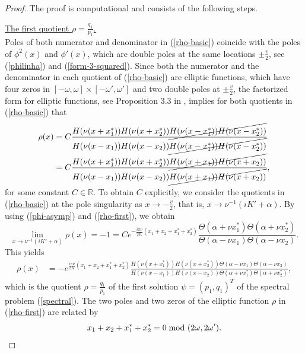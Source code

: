 \documentclass[12pt,reqno]{amsart}
\numberwithin{equation}{section}
\newcommand{\R}{\mathbb{R}}
\begin{document}
\begin{proof}
	The proof is computational and consists of the following steps. 

\underline{The first quotient $\rho = \frac{q_1}{p_1}$.} \\
Poles of both numerator and denominator in (\ref{rho-basic}) coincide with the poles of $\phi^2(x)$ and $\phi'(x)$, which are double poles at the same locations $\pm \frac{v}{2}$, see (\ref{philinha}) and (\ref{form-3-squared}). Since both the numerator and the denominator in each quotient of (\ref{rho-basic}) are elliptic functions, which have four zeros in $[-\omega,\omega] \times [-\omega',\omega']$  and two double poles at $\pm \frac{v}{2}$, the factorized form for elliptic functions, see Proposition 3.3 in \cite{AP25}, implies 
for both quotients in (\ref{rho-basic}) that 
\begin{align}
\rho(x) &= C 
\frac{H(\nu (x + x_1^*)) H(\nu (x + x_2^*)) 
	\cancel{H(\nu (x - x_1^*)) H(\nu (x - x_2^*))}}{H(\nu (x - x_1)) H(\nu (x - x_2)) 
	\cancel{H(\nu (x - x_1^*)) H(\nu (x - x_2^*))}} \notag \\
&= C \frac{H(\nu (x + x_1^*)) H(\nu (x + x_2^*)) 
	\cancel{H(\nu (x + x_1)) H(\nu (x + x_2))}}{H(\nu (x - x_1)) H(\nu (x - x_2)) 
	\cancel{H(\nu (x + x_1)) H(\nu (x + x_2))}}, \label{rho-first}
\end{align} 
for some constant $C \in \R$. To obtain $C$ explicitly, we consider the quotients in (\ref{rho-basic}) at the pole singularity as $x \to -\frac{v}{2}$, that is, 
$x \to \nu^{-1} (iK'+\alpha)$.  By using (\ref{phi-asymp}) and (\ref{rho-first}), we obtain 
\begin{equation}
\label{constant-C-unique}
\lim_{x \to \nu^{-1} (iK'+\alpha)} \rho(x) = -1 = C e^{-\frac{i\pi \nu}{2K} (x_1 + x_2 + x_1^* + x_2^*)} \frac{\Theta(\alpha + \nu x_1^*) \Theta(\alpha + \nu x_2^*)}{\Theta(\alpha - \nu x_1) \Theta(\alpha - \nu x_2)}.
\end{equation}
This yields 
\begin{align}
\rho(x) &= -e^{\frac{i\pi \nu}{2K} (x_1 + x_2 + x_1^* + x_2^*)} 
\frac{H(\nu (x + x_1^*)) H(\nu (x + x_2^*)) \Theta(\alpha - \nu x_1) \Theta(\alpha - \nu x_2)}{H(\nu (x - x_1)) H(\nu (x - x_2)) \Theta(\alpha + \nu x_1^*) \Theta(\alpha + \nu x_2^*)}, \label{rho-final}
\end{align} 
which is the quotient $\rho = \frac{q_1}{p_1}$ of the first solution $\psi = (p_1,q_1)^T$ of the spectral problem (\ref{spectral}). The two poles and two zeros of the elliptic function $\rho$ in (\ref{rho-first}) are related by 
\begin{equation*}
x_1 + x_2 + x_1^* + x_2^* = 0 \; \mbox{\rm mod } (2\omega, 2 \omega').
\end{equation*}


\end{proof}
\end{document}
